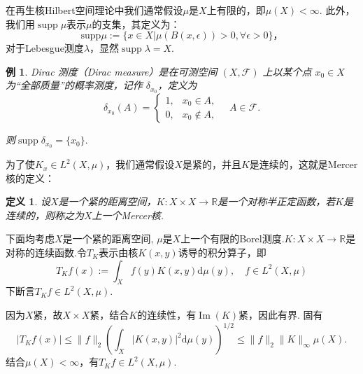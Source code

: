 \documentclass[12pt, a4paper, oneside]{ctexbook}
\newtheorem{definition}[theorem]{定义}
\newtheorem{example}[theorem]{例}
\begin{document}
在再生核Hilbert空间理论中我们通常假设$\mu$是$X$上有限的，即$\mu(X)<\infty$. 此外，我们用$\operatorname{supp} \mu$表示$\mu$的支集，其定义为：
\begin{equation*}
    \mathrm{supp}\mu:=\{x\in X|\mu(B(x,\epsilon))>0,\forall\epsilon>0\}，
\end{equation*}
对于Lebesgue测度$\lambda$，显然$\operatorname{supp}\lambda=X$.
\begin{example}
    Dirac 测度（Dirac measure）是在可测空间 $(X, \mathcal{F})$ 上以某个点 $x_0 \in X$ 为“全部质量”的概率测度，记作 $\delta_{x_0}$，定义为
$$\delta_{x_0}(A) = \begin{cases}
1, & x_0 \in A, \\
0, & x_0 \notin A,
\end{cases} \quad A \in \mathcal{F}.$$

则$\operatorname{supp}\delta_{x_0}=\{x_0\}.$
\end{example}

为了使$K_x\in L^2(X,\mu)$，我们通常假设$X$是紧的，并且$K$是连续的，这就是Mercer核的定义：
\begin{definition}
    设$X$是一个紧的距离空间，$K:X\times X\to\mathbb{R}$是一个对称半正定函数，若$K$是连续的，则称之为$X$上一个Mercer核.
\end{definition}


下面均考虑$X$是一个紧的距离空间, $\mu$是$X$上一个有限的Borel测度.$K:X\times X\to\mathbb{R}$是对称的连续函数.令$T_K$表示由核$K(x,y)$诱导的积分算子，即
\begin{equation*}
    T_Kf(x):=\int_X f(y)K(x,y)\mathrm{d}\mu(y),\quad f\in L^2(X,\mu)
\end{equation*}
下断言$T_Kf\in L^2(X,\mu)$.

因为$X$紧，故$X\times X$紧，结合$K$的连续性，有$\operatorname{Im}(K)$紧，因此有界. 固有
\begin{equation*}
    \left|T_Kf(x)\right|\leq \|f\|_2\left(\int_X |K(x,y)|^2\mathrm{d}\mu(y)\right)^{1/2}\leq \|f\|_2\|K\|_\infty \mu(X).
\end{equation*}
结合$\mu(X)<\infty$，有$T_Kf\in L^2(X,\mu)$.
\end{document}
